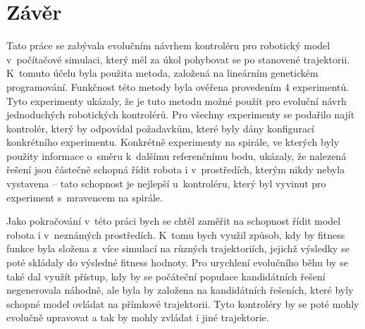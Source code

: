 \chapter{Závěr}
\label{chap:zaver}
Tato práce se zabývala evolučním návrhem kontroléru pro robotický model v~počítačové simulaci, který měl za úkol pohybovat se po stanovené trajektorii.
K~tomuto účelu byla použita metoda, založená na lineárním genetickém programování.
Funkčnost této metody byla ověřena provedením 4 experimentů.
Tyto experimenty ukázaly, že je tuto metodu možné použít pro evoluční návrh jednoduchých robotických kontrolérů.
Pro všechny experimenty se podařilo najít kontrolér, který by odpovídal požadavkům, které byly dány konfigurací konkrétního experimentu.
Konkrétně experimenty na spirále, ve kterých byly použity informace o~směru k~dalšímu referenčnímu bodu, ukázaly, že nalezená řešení jsou částečně schopná řídit robota i v~prostředích, kterým nikdy nebyla vystavena -- tato schopnost je nejlepší u~kontroléru, který byl vyvinut pro experiment s~mravencem na spirále.

Jako pokračování v~této práci bych se chtěl zaměřit na schopnost řídit model robota i v~neznámých prostředích.
K~tomu bych využil způsob, kdy by fitness funkce byla složena z~více simulací na různých trajektoriích, jejichž výsledky se poté skládaly do výsledné fitness hodnoty.
Pro urychlení evolučního běhu by se také dal využít přístup, kdy by se počáteční populace kandidátních řešení negenerovala náhodně, ale byla by založena na kandidátních řešeních, které byly schopné model ovládat na přímkové trajektorii.
Tyto kontroléry by se poté mohly evolučně upravovat a tak by mohly zvládat i jiné trajektorie.

